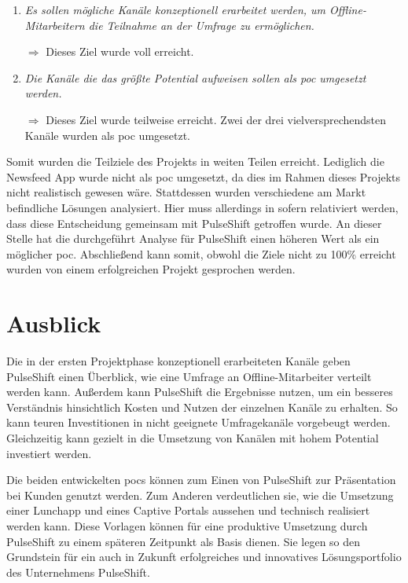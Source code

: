 \begin{enumerate}
\item \textit{Es sollen mögliche Kanäle konzeptionell erarbeitet werden, um Offline-Mitarbeitern die Teilnahme an der Umfrage zu ermöglichen.}

$\Rightarrow$ Dieses Ziel wurde voll erreicht.

\item \textit{Die Kanäle die das größte Potential aufweisen sollen als \gls{poc} umgesetzt werden.}

$\Rightarrow$ Dieses Ziel wurde teilweise erreicht. Zwei der drei vielversprechendsten Kanäle wurden als \gls{poc} umgesetzt. 
\end{enumerate}

Somit wurden die Teilziele des Projekts in weiten Teilen erreicht. Lediglich die Newsfeed App wurde nicht als \gls{poc} umgesetzt, da dies im Rahmen dieses Projekts nicht realistisch gewesen wäre. Stattdessen wurden verschiedene am Markt befindliche Lösungen analysiert. Hier muss allerdings in sofern relativiert werden, dass diese Entscheidung gemeinsam mit PulseShift getroffen wurde. An dieser Stelle hat die durchgeführt Analyse für PulseShift einen höheren Wert als ein möglicher \gls{poc}. Abschließend kann somit, obwohl die Ziele nicht zu 100\% erreicht wurden von einem erfolgreichen Projekt gesprochen werden.

\section{Ausblick}

Die in der ersten Projektphase konzeptionell erarbeiteten Kanäle geben PulseShift einen Überblick, wie eine Umfrage an Offline-Mitarbeiter verteilt werden kann. Außerdem kann PulseShift die Ergebnisse nutzen, um ein besseres Verständnis hinsichtlich Kosten und Nutzen der einzelnen Kanäle zu erhalten. So kann teuren Investitionen in nicht geeignete Umfragekanäle vorgebeugt werden. Gleichzeitig kann gezielt in die Umsetzung von Kanälen mit hohem Potential investiert werden. 

Die beiden entwickelten \gls{poc}s können zum Einen von PulseShift zur Präsentation bei Kunden genutzt werden. Zum Anderen verdeutlichen sie, wie die Umsetzung einer Lunchapp und eines Captive Portals aussehen und technisch realisiert werden kann. Diese Vorlagen können für eine produktive Umsetzung durch PulseShift zu einem späteren Zeitpunkt als Basis dienen. Sie legen so den Grundstein für ein auch in Zukunft erfolgreiches und innovatives Lösungsportfolio des Unternehmens PulseShift.